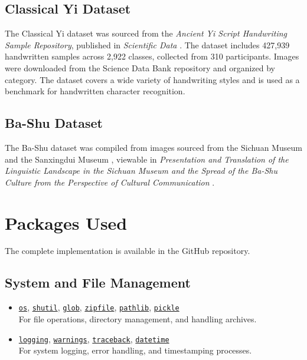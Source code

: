 \documentclass[11pt,a4paper,oneside]{report}
\begin{document}
\subsection*{Classical Yi Dataset}
The Classical Yi dataset was sourced from the \textit{Ancient Yi Script Handwriting Sample Repository}, published in \textit{Scientific Data} \cite{liu_ancient_2024}. The dataset includes 427,939 handwritten samples across 2,922 classes, collected from 310 participants. Images were downloaded from the Science Data Bank repository and organized by category. The dataset covers a wide variety of handwriting styles and is used as a benchmark for handwritten character recognition.

\subsection*{Ba-Shu Dataset}
The Ba-Shu dataset was compiled from images sourced from the Sichuan Museum \cite{sichuan_museum_ba-shu_2023} and the Sanxingdui Museum \cite{sanxingdui_museum_sanxingdui_2023}, viewable in \textit{Presentation and Translation of the Linguistic Landscape in the Sichuan Museum and the Spread of the Ba-Shu Culture from the Perspective of Cultural Communication} \cite{zhang_presentation_2023}. 

\section{Packages Used}
\label{app: packages}
\noindent\hspace{1cm}

The complete implementation is available in the GitHub repository.

\subsection*{System and File Management}
\begin{itemize}
    \item \href{https://docs.python.org/3/library/os.html}{\texttt{os}}, \href{https://docs.python.org/3/library/shutil.html}{\texttt{shutil}}, \href{https://docs.python.org/3/library/glob.html}{\texttt{glob}}, \href{https://docs.python.org/3/library/zipfile.html}{\texttt{zipfile}}, \href{https://docs.python.org/3/library/pathlib.html}{\texttt{pathlib}}, \href{https://docs.python.org/3/library/pickle.html}{\texttt{pickle}} \\
    For file operations, directory management, and handling archives.
    
    \item \href{https://docs.python.org/3/library/logging.html}{\texttt{logging}}, \href{https://docs.python.org/3/library/warnings.html}{\texttt{warnings}}, \href{https://docs.python.org/3/library/traceback.html}{\texttt{traceback}}, \href{https://docs.python.org/3/library/datetime.html}{\texttt{datetime}} \\
    For system logging, error handling, and timestamping processes.
\end{itemize}
\end{document}
